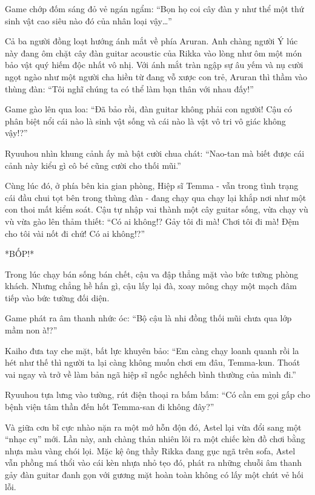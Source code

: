 \documentclass[../main.tex]{subfiles}
\begin{document}
Game chớp đốm sáng đỏ vẻ ngán ngẩm: ``Bọn họ coi cây đàn y như thể một thứ sinh vật cao siêu nào đó của nhân loại vậy\dots''

Cả ba người đồng loạt hướng ánh mắt về phía Aruran. Anh chàng người Ý lúc này đang ôm chặt cây đàn guitar acoustic của Rikka vào lòng như ôm một món bảo vật quý hiếm độc nhất vô nhị. Với ánh mắt tràn ngập sự âu yếm và nụ cười ngọt ngào như một người cha hiền từ đang vỗ xược con trẻ, Aruran thì thầm vào thùng đàn: ``Tôi nghĩ chúng ta có thể làm bạn thân với nhau đấy!''


Game gào lên qua loa: ``Đã bảo rồi, đàn guitar không phải con người! Cậu có phân biệt nổi cái nào là sinh vật sống và cái nào là vật vô tri vô giác không vậy!?''

Ryuuhou nhìn khung cảnh ấy mà bật cười chua chát: ``Nao-tan mà biết được cái cảnh này kiểu gì cô bé cũng cười cho thối mũi.''

Cùng lúc đó, ở phía bên kia gian phòng, Hiệp sĩ Temma - vẫn trong tình trạng cái đầu chui tọt bên trong thùng đàn - đang chạy qua chạy lại khắp nơi như một con thoi mất kiểm soát. Cậu tự nhập vai thành một cây guitar sống, vừa chạy vù vù vừa gào lên thảm thiết: ``Có ai không!? Gảy tôi đi mà! Chơi tôi đi mà! Đệm cho tôi vài nốt đi chứ! Có ai không!?''


*BỐP!*

Trong lúc chạy bán sống bán chết, cậu va đập thẳng mặt vào bức tường phòng khách. Nhưng chẳng hề hấn gì, cậu lấy lại đà, xoay mông chạy một mạch đâm tiếp vào bức tường đối diện.

Game phát ra âm thanh nhức óc: ``Bộ cậu là nhi đồng thối mũi chưa qua lớp mầm non à!?''

Kaiho đưa tay che mặt, bất lực khuyên bảo: ``Em càng chạy loanh quanh rồi la hét như thế thì người ta lại càng không muốn chơi em đâu, Temma-kun. Thoát vai ngay và trở về làm bản ngã hiệp sĩ ngốc nghếch bình thường của mình đi.''

Ryuuhou tựa lưng vào tường, rút điện thoại ra bấm bấm: ``Có cần em gọi gấp cho bệnh viện tâm thần đến hốt Temma-san đi không đây?''

Và giữa cơn bĩ cực nhào nặn ra một mớ hỗn độn đó, Astel lại vừa đổi sang một ``nhạc cụ'' mới. Lần này, anh chàng thản nhiên lôi ra một chiếc kèn đồ chơi bằng nhựa màu vàng chói lọi. Mặc kệ ông thầy Rikka đang gục ngã trên sofa, Astel vẫn phồng má thổi vào cái kèn nhựa nhỏ tẹo đó, phát ra những chuỗi âm thanh gảy đàn guitar đanh gọn với gương mặt hoàn toàn không có lấy một chút vẻ hối lỗi.
\end{document}
